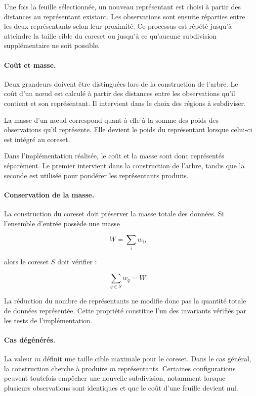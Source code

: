 Une fois la feuille sélectionnée, un nouveau représentant est choisi à partir des distances au représentant existant. Les observations sont ensuite réparties entre les deux représentants selon leur proximité. Ce processus est répété jusqu'à atteindre la taille cible du coreset ou jusqu'à ce qu'aucune subdivision supplémentaire ne soit possible.

\paragraph{Coût et masse.}

Deux grandeurs doivent être distinguées lors de la construction de l'arbre. Le coût d'un nœud est calculé à partir des distances entre les observations qu'il contient et son représentant. Il intervient dans le choix des régions à subdiviser.

La masse d'un nœud correspond quant à elle à la somme des poids des observations qu'il représente. Elle devient le poids du représentant lorsque celui-ci est intégré au coreset.

Dans l'implémentation réalisée, le coût et la masse sont donc représentés séparément. Le premier intervient dans la construction de l'arbre, tandis que la seconde est utilisée pour pondérer les représentants produits.

\paragraph{Conservation de la masse.}

La construction du coreset doit préserver la masse totale des données. Si l'ensemble d'entrée possède une masse

\[
W =
\sum_i w_i,
\]

alors le coreset \(S\) doit vérifier :

\[
\sum_{q \in S} w_q = W.
\]

La réduction du nombre de représentants ne modifie donc pas la quantité totale de données représentée. Cette propriété constitue l'un des invariants vérifiés par les tests de l'implémentation.

\paragraph{Cas dégénérés.}

La valeur \(m\) définit une taille cible maximale pour le coreset. Dans le cas général, la construction cherche à produire \(m\) représentants. Certaines configurations peuvent toutefois empêcher une nouvelle subdivision, notamment lorsque plusieurs observations sont identiques et que le coût d'une feuille devient nul.

